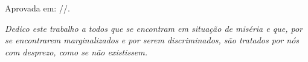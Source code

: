 \documentclass[
	12pt,				%
	openright,			%
	twoside,			%
	a4paper,			%
	english,			%
  	brazil				%
	]{abntex2}
\begin{document}
%
% 
%
\begin{folhadeaprovacao}

  \begin{center}
    {\MakeUppercase{\imprimirautor}}

    \vspace*{\fill}\vspace*{\fill}
    \begin{center}
      \MakeUppercase{\imprimirtitulo}
    \end{center}
    \vspace*{\fill}
    
    \hspace{.45\textwidth}
    \begin{minipage}{.5\textwidth}
        \imprimirpreambulo
    \end{minipage}%
    \vspace*{\fill}
   \end{center}
        
   Aprovada em: \underline{\hspace{0.5cm}}/\underline{\hspace{0.5cm}}/\underline{\hspace{2cm}}.

\end{folhadeaprovacao}

\begin{dedicatoria}
   \vspace*{\fill}
   \centering
   \noindent
   \textit{ Dedico este trabalho a todos que se encontram em situação de miséria e que, por se encontrarem marginalizados e por serem discriminados, são tratados por nós com desprezo, como se não existissem.} \vspace*{\fill}
\end{dedicatoria}
\end{document}
